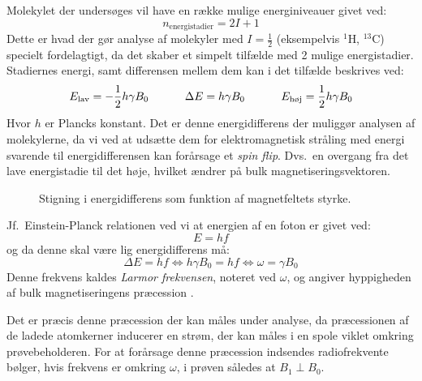     Molekylet der undersøges vil have en række mulige energiniveauer givet ved:
    \[
        n_{\text{energistadier}}=2I+1
    \]
    Dette er hvad der gør analyse af molekyler med $I=\frac{1}{2}$ (eksempelvis $^1$H, $^{13}$C) specielt fordelagtigt, da det skaber et simpelt tilfælde med 2 mulige energistadier. Stadiernes energi, samt differensen mellem dem kan i det tilfælde beskrives ved:
    \[
        E_{\text{lav}}=-\frac{1}{2}h\gamma B_0 \hskip 32pt \Delta E=h\gamma B_0 \hskip 32pt E_{\text{høj}}=\frac{1}{2}h\gamma B_0
    \]
    Hvor $h$ er Plancks konstant. Det er denne energidifferens der muliggør analysen af molekylerne, da vi ved at udsætte dem for elektromagnetisk stråling med energi svarende til energidifferensen kan forårsage et \textit{spin flip}. Dvs.\ en overgang fra det lave energistadie til det høje, hvilket ændrer på bulk magnetiseringsvektoren. 
    \begin{figure}[H]
        \caption{Stigning i energidifferens som funktion af magnetfeltets styrke.}
    \end{figure}
    Jf.\ Einstein-Planck relationen ved vi at energien af en foton er givet ved:
    \[
        E=hf
    \]
    og da denne skal være lig energidifferens må:
    \[
        \Delta E=hf \Leftrightarrow h\gamma B_0 =hf \Leftrightarrow \omega=\gamma B_0 
    \]
    Denne frekvens kaldes \textit{Larmor frekvensen}, noteret ved $\omega$, og angiver hyppigheden af bulk magnetiseringens præcession \parencite{Derr1,Derr2}.

    Det er præcis denne præcession der kan måles under analyse, da præcessionen af de ladede atomkerner inducerer en strøm, der kan måles i en spole viklet omkring prøvebeholderen. For at forårsage denne præcession indsendes radiofrekvente bølger, hvis frekvens er omkring $\omega$, i prøven således at $B_1 \perp B_0$. 

